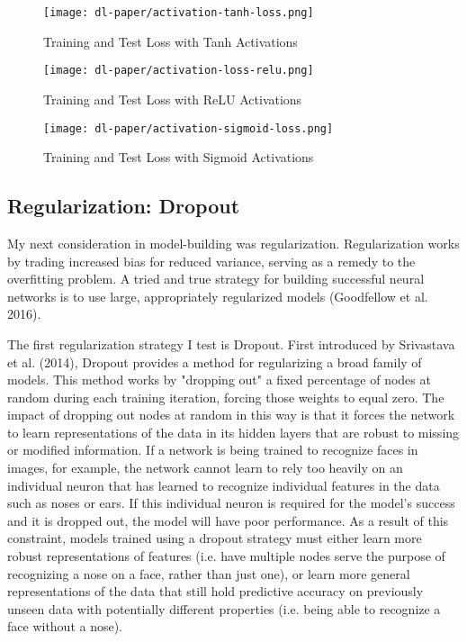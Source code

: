 \documentclass[12pt]{article}  %
\theoremstyle{definition}
\theoremstyle{remark}
\begin{document}
\begin{figure}[!h]
  \texttt{[image: dl-paper/activation-tanh-loss.png]}
  \caption{Training and Test Loss with Tanh Activations}\label{tanh}
\endminipage\hfill
{}
  \texttt{[image: dl-paper/activation-loss-relu.png]}
  \caption{Training and Test Loss with ReLU Activations}\label{relu}
\endminipage\hfill
{}%
  \texttt{[image: dl-paper/activation-sigmoid-loss.png]}
  \caption{Training and Test Loss with Sigmoid Activations}\label{sigmoid}
\endminipage
\end{figure}


\subsection{Regularization: Dropout}
\par My next consideration in model-building was regularization. Regularization works by trading increased bias for reduced variance, serving as a remedy to the overfitting problem. A tried and true strategy for building successful neural networks is to use large, appropriately regularized models (Goodfellow et al. 2016). 
\par The first regularization strategy I test is Dropout. First introduced by Srivastava et al. (2014), Dropout provides a method for regularizing a broad family of models. This method works by "dropping out" a fixed percentage of nodes at random during each training iteration, forcing those weights to equal zero. The impact of dropping out nodes at random in this way is that it forces the network to learn representations of the data in its hidden layers that are robust to missing or modified information. If a network is being trained to recognize faces in images, for example, the network cannot learn to rely too heavily on an individual neuron that has learned to recognize individual features in the data such as noses or ears. If this individual neuron is required for the model's success and it is dropped out, the model will have poor performance. As a result of this constraint, models trained using a dropout strategy must either learn more robust representations of features (i.e. have multiple nodes serve the purpose of recognizing a nose on a face, rather than just one), or learn more general representations of the data that still hold predictive accuracy on previously unseen data with potentially different properties (i.e. being able to recognize a face without a nose).  
\end{document}
